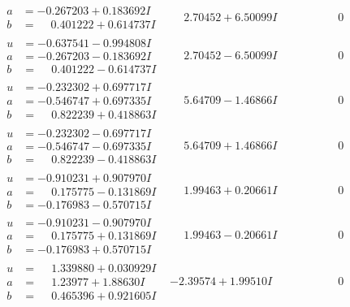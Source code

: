 \documentclass[1p]{elsarticle_modified}
\theoremstyle{definition}
\begin{document}
$$\begin{array}{c|c|c}
\begin{aligned}
a &= -0.267203 + 0.183692 I \\
b &= \phantom{-}0.401222 + 0.614737 I\end{aligned}
 & \phantom{-}2.70452 + 6.50099 I & \phantom{-0.000000 } 0 \\ \hline\begin{aligned}
u &= -0.637541 - 0.994808 I \\
a &= -0.267203 - 0.183692 I \\
b &= \phantom{-}0.401222 - 0.614737 I\end{aligned}
 & \phantom{-}2.70452 - 6.50099 I & \phantom{-0.000000 } 0 \\ \hline\begin{aligned}
u &= -0.232302 + 0.697717 I \\
a &= -0.546747 + 0.697335 I \\
b &= \phantom{-}0.822239 + 0.418863 I\end{aligned}
 & \phantom{-}5.64709 - 1.46866 I & \phantom{-0.000000 } 0 \\ \hline\begin{aligned}
u &= -0.232302 - 0.697717 I \\
a &= -0.546747 - 0.697335 I \\
b &= \phantom{-}0.822239 - 0.418863 I\end{aligned}
 & \phantom{-}5.64709 + 1.46866 I & \phantom{-0.000000 } 0 \\ \hline\begin{aligned}
u &= -0.910231 + 0.907970 I \\
a &= \phantom{-}0.175775 - 0.131869 I \\
b &= -0.176983 - 0.570715 I\end{aligned}
 & \phantom{-}1.99463 + 0.20661 I & \phantom{-0.000000 } 0 \\ \hline\begin{aligned}
u &= -0.910231 - 0.907970 I \\
a &= \phantom{-}0.175775 + 0.131869 I \\
b &= -0.176983 + 0.570715 I\end{aligned}
 & \phantom{-}1.99463 - 0.20661 I & \phantom{-0.000000 } 0 \\ \hline\begin{aligned}
u &= \phantom{-}1.339880 + 0.030929 I \\
a &= \phantom{-}1.23977 + 1.88630 I \\
b &= \phantom{-}0.465396 + 0.921605 I\end{aligned}
 & -2.39574 + 1.99510 I & \phantom{-0.000000 } 0 \\ \hline\begin{aligned}

\end{aligned}
\end{array}$$
\end{document}
